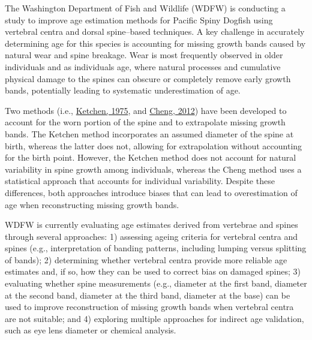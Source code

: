 \documentclass[
  english,
]{article}
\begin{document}
The Washington Department of Fish and Wildlife (WDFW) is conducting a
study to improve age estimation methods for Pacific Spiny Dogfish using
vertebral centra and dorsal spine--based techniques. A key challenge in
accurately determining age for this species is accounting for missing
growth bands caused by natural wear and spine breakage. Wear is most
frequently observed in older individuals and as individuals age, where
natural processes and cumulative physical damage to the spines can
obscure or completely remove early growth bands, potentially leading to
systematic underestimation of age.

Two methods (i.e.,
\href{https://cdnsciencepub.com/doi/10.1139/f72-272}{Ketchen, 1975}, and
\href{http://www.ceser.in/ceserp/index.php/ijamas/article/view/651}{Cheng,
2012}) have been developed to account for the worn portion of the spine
and to extrapolate missing growth bands. The Ketchen method incorporates
an assumed diameter of the spine at birth, whereas the latter does not,
allowing for extrapolation without accounting for the birth point.
However, the Ketchen method does not account for natural variability in
spine growth among individuals, whereas the Cheng method uses a
statistical approach that accounts for individual variability. Despite
these differences, both approaches introduce biases that can lead to
overestimation of age when reconstructing missing growth bands.

WDFW is currently evaluating age estimates derived from vertebrae and
spines through several approaches: 1) assessing ageing criteria for
vertebral centra and spines (e.g., interpretation of banding patterns,
including lumping versus splitting of bands); 2) determining whether
vertebral centra provide more reliable age estimates and, if so, how
they can be used to correct bias on damaged spines; 3) evaluating
whether spine measurements (e.g., diameter at the first band, diameter
at the second band, diameter at the third band, diameter at the base)
can be used to improve reconstruction of missing growth bands when
vertebral centra are not suitable; and 4) exploring multiple approaches
for indirect age validation, such as eye lens diameter or chemical
analysis.
\end{document}
